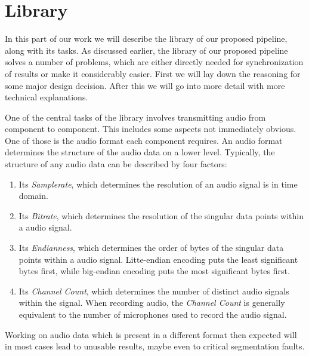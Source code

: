 


\section{Library}
\label{main:lib}
In this part of our work we will describe the library of our proposed pipeline, along with its tasks.
As discussed earlier, the library of our proposed pipeline solves a number of problems, which are either directly needed for synchronization of results or make it considerably easier.
First we will lay down the reasoning for some major design decision.
After this we will go into more detail with more technical explanations.


One of the central tasks of the library involves transmitting audio from component to component.
This includes some aspects not immediately obvious.
One of those is the audio format each component requires.
An audio format determines the structure of the audio data on a lower level.
Typically, the structure of any audio data can be described by four factors:
\begin{enumerate}
	\item Its \textit{Samplerate}, which determines the resolution of an audio signal is in time domain.
	\item Its \textit{Bitrate}, which determines the resolution of the singular data points within a audio signal.
	\item Its \textit{Endianness}, which determines the order of bytes of the singular data points within a audio signal. Litte-endian encoding puts the least significant bytes first, while big-endian encoding puts the most significant bytes first. 
	\item Its \textit{Channel Count}, which determines the number of distinct audio signals within the signal. When recording audio, the \textit{Channel Count} is generally equivalent to the number of microphones used to record the audio signal.
\end{enumerate}
Working on audio data which is present in a different format then expected will in most cases lead to unusable results, maybe even to critical segmentation faults. 

